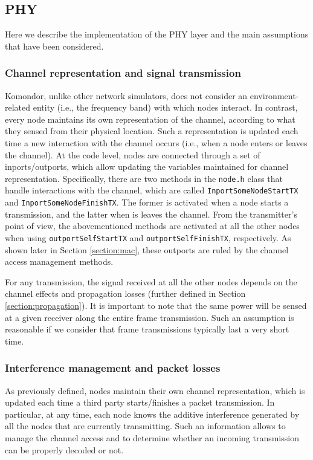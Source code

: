 \documentclass[a4paper]{article}
\begin{document}
\subsection{PHY}
\label{section:phy}
Here we describe the implementation of the PHY layer and the main assumptions that have been considered.
	
	\subsubsection{Channel representation and signal transmission}	
	Komondor, unlike other network simulators, does not consider an environment-related entity (i.e., the frequency band) with which nodes interact. In contrast, every node maintains its own representation of the channel, according to what they sensed from their physical location. Such a representation is updated each time a new interaction with the channel occurs (i.e., when a node enters or leaves the channel). At the code level, nodes are connected through a set of inports/outports, which allow updating the variables maintained for channel representation. Specifically, there are two methods in the \texttt{node.h} class that handle interactions with the channel, which are called \texttt{InportSomeNodeStartTX} and \texttt{InportSomeNodeFinishTX}. The former is activated when a node starts a transmission, and the latter when is leaves the channel. From the transmitter's point of view, the abovementioned methods are activated at all the other nodes when using \texttt{outportSelfStartTX} and \texttt{outportSelfFinishTX}, respectively. As shown later in Section \ref{section:mac}, these outports are ruled by the channel access management methods.
	
	For any transmission, the signal received at all the other nodes depends on the channel effects and propagation losses (further defined in Section \ref{section:propagation}). It is important to note that the same power will be sensed at a given receiver along the entire frame transmission. Such an assumption is reasonable if we consider that frame transmissions typically last a very short time.
	
	\subsubsection{Interference management and packet losses}
	\label{section:interference}
	As previously defined, nodes maintain their own channel representation, which is updated each time a third party starts/finishes a packet transmission. In particular, at any time, each node knows the additive interference generated by all the nodes that are currently transmitting. Such an information allows to manage the channel access and to determine whether an incoming transmission can be properly decoded or not. 
	
\end{document}
